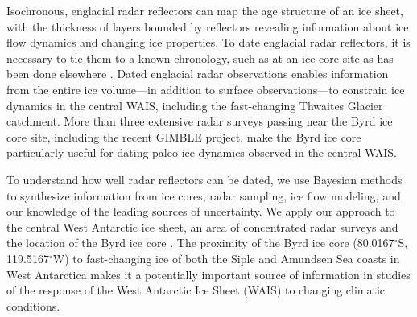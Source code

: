 

Isochronous, englacial radar reflectors can map the age structure of an ice sheet, with the thickness of layers bounded by reflectors revealing information about ice flow dynamics and changing ice properties. To date englacial radar reflectors, it is necessary to tie them to a known chronology, such as at an ice core site as has been done elsewhere \citep{cavitte2016}. Dated englacial radar observations enables information from the entire ice volume---in addition to surface observations---to constrain ice dynamics in the central WAIS, including the fast-changing Thwaites Glacier catchment. More than three extensive radar surveys passing near the Byrd ice core site, including the recent GIMBLE project, make the Byrd ice core particularly useful for dating paleo ice dynamics observed in the central WAIS.

To understand how well radar reflectors can be dated, we use Bayesian methods to synthesize information from ice cores, radar sampling, ice flow modeling, and our knowledge of the leading sources of uncertainty. We apply our approach to the central West Antarctic ice sheet, an area of concentrated radar surveys and the location of the Byrd ice core \citep{gow1968}. The proximity of the Byrd ice core (80.0167$^\circ$S, 119.5167$^\circ$W) to fast-changing ice of both the Siple and Amundsen Sea coasts in West Antarctica makes it a potentially important source of information in studies of the response of the West Antarctic Ice Sheet (WAIS) to changing climatic conditions.



